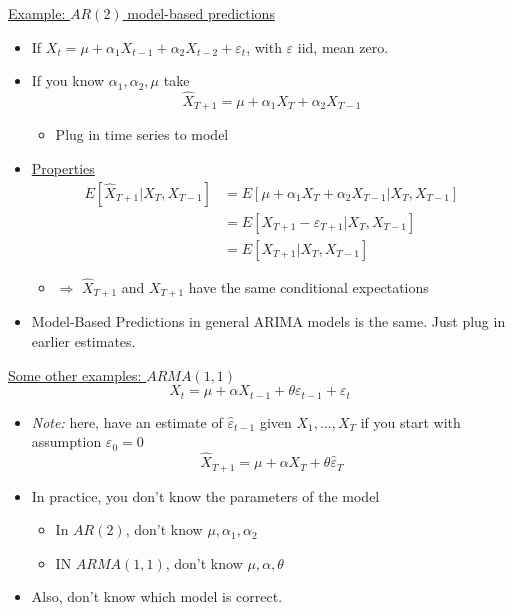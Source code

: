 \underline{Example: \quad $AR(2)$ model-based predictions}
\begin{itemize}
    \item If $X_t=\mu +\alpha_1X_{t-1} + \alpha_2 X_{t-2}+\varepsilon_t$, with $\varepsilon$ iid, mean zero.
    \item If you know $\alpha_1, \alpha_2, \mu$ take \[\hat{X}_{T+1}=\mu +\alpha_1 X_T + \alpha_2 X_{T-1} \]
    \begin{itemize}
        \item Plug in time series to model
    \end{itemize}
    \item \underline{Properties}
    \begin{align*}
        E[\hat{X}_{T+1} | X_T, X_{T-1}] &= E[\mu+\alpha_1 X_T+\alpha_2 X_{T-1} |X_T, X_{T-1}]\\
        &=E[X_{T+1}-\varepsilon_{T+1} | X_T, X_{T-1}]\\
        &=E[X_{T+1} | X_T, X_{T-1}]
    \end{align*}
    \begin{itemize}
        \item[] $\Rightarrow$ $\hat{X}_{T+1}$ and $X_{T+1}$ have the same conditional expectations
    \end{itemize}
    \item Model-Based Predictions in general ARIMA models is the same. Just plug in earlier estimates.
\end{itemize}

\underline{Some other examples: $ARMA(1,1)$}
\[X_t=\mu + \alpha X_{t-1}+\theta \varepsilon_{t-1}+\varepsilon_t \]
\begin{itemize}
    \item[] \textit{Note:} here, have an estimate of $\hat{\varepsilon}_{t-1} $ given $X_1,...,X_T$ if you start with assumption $\varepsilon_0=0$
    \[\hat{X}_{T+1}=\mu +\alpha X_T+\theta \hat{\varepsilon}_T \]
    \item In practice, you don't know the parameters of the model
    \begin{itemize}
        \item In $AR(2)$, don't know $\mu, \alpha_1, \alpha_2$
        \item IN $ARMA(1,1)$, don't know $\mu,\alpha, \theta $
    \end{itemize}
    \item Also, don't know which model is correct.
\end{itemize}

